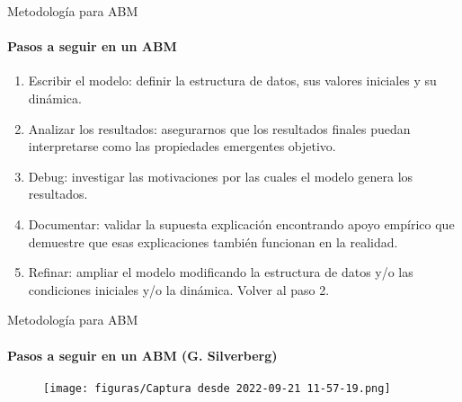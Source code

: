 \documentclass[11pt]{beamer}
\begin{document}
\begin{frame}
\begin{comment}
An ABM can therefore be used to replicate not (only) the state
of a system, but the very explanations linking its states.
\end{frame}


\begin{frame}{Methodology for ABM}
\framesubtitle{Qualitative phenomena}
Using a model to target a \textbf{qualitative} phenomenon should follow
this procedure:
\begin{enumerate}
    \item Define a research question in terms of a conjectured
explanation.
\item Implement the elements relevant for the phenomenon.
\item Ensure that the overall result is compatible with available
evidence (replicate the emergent property).
\item Identify how the results are generated: verify the model.
\item Compare the explanations for the simulated events with
those in real systems.
\end{enumerate}
The advantage of ABM is to allow the investigation of \textbf{how} a
well-specified phenomenon occurs.
\end{frame}

\end{comment}

\begin{frame}{Metodología para ABM}
\framesubtitle{Pasos a seguir en un ABM}
\begin{enumerate}
    \item Escribir el modelo: definir la estructura de datos, sus valores iniciales y su dinámica.
\item Analizar los resultados: asegurarnos que los resultados finales puedan interpretarse como las propiedades emergentes objetivo.
\item Debug: investigar las motivaciones por las cuales el modelo genera los resultados.
\item Documentar: validar la supuesta explicación encontrando apoyo empírico que demuestre que esas explicaciones también funcionan en la realidad.
\item Refinar: ampliar el modelo modificando la estructura de datos y/o las condiciones iniciales y/o la dinámica. Volver al paso 2.
\end{enumerate}
\end{frame} 

\begin{frame}{Metodología para ABM}
\framesubtitle{Pasos a seguir en un ABM (G. Silverberg)}
    \begin{figure}
        \centering
        \texttt{[image: figuras/Captura desde 2022-09-21 11-57-19.png]}
    \end{figure}
\end{frame}


\end{frame}
\end{document}
